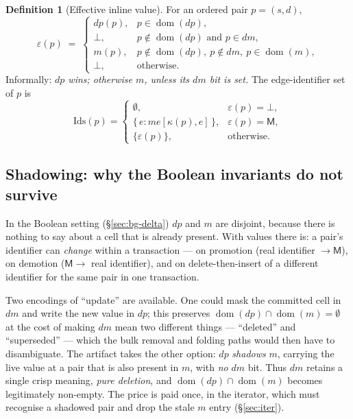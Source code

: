 \documentclass[11pt,a4paper]{article}
\theoremstyle{plain}
\theoremstyle{definition}
\newtheorem{definition}[theorem]{Definition}
\theoremstyle{remark}
\newcommand{\M}{\mathsf{M}}
\newcommand{\dom}{\operatorname{dom}}
\begin{document}
\begin{definition}[Effective inline value]
\label{def:eff}
For an ordered pair $p = (s,d)$,
\[
  \varepsilon(p) \;=\;
  \begin{cases}
    dp(p), & p \in \dom(dp),\\
    \bot,  & p \notin \dom(dp) \text{ and } p \in dm,\\
    m(p),  & p \notin \dom(dp),\ p \notin dm,\ p \in \dom(m),\\
    \bot,  & \text{otherwise.}
  \end{cases}
\]
Informally: \emph{$dp$ wins; otherwise $m$, unless its $dm$ bit is set.} The
edge-identifier set of $p$ is
\[
  \mathrm{Ids}(p) =
  \begin{cases}
    \emptyset, & \varepsilon(p) = \bot,\\
    \{\, e : me[\kappa(p), e] \,\}, & \varepsilon(p) = \M,\\
    \{\varepsilon(p)\}, & \text{otherwise.}
  \end{cases}
\]
\end{definition}

\subsection{Shadowing: why the Boolean invariants do not survive}

In the Boolean setting (\S\ref{sec:bg-delta}) $dp$ and $m$ are disjoint,
because there is nothing to say about a cell that is already present. With
values there is: a pair's identifier can \emph{change} within a transaction
--- on promotion (real identifier $\to \M$), on demotion ($\M \to$ real
identifier), and on delete-then-insert of a different identifier for the same
pair in one transaction.

Two encodings of ``update'' are available. One could mask the committed cell
in $dm$ and write the new value in $dp$; this preserves
$\dom(dp) \cap \dom(m) = \emptyset$ at the cost of making $dm$ mean two
different things --- ``deleted'' and ``superseded'' --- which the bulk removal
and folding paths would then have to disambiguate. The artifact takes the
other option: $dp$ \emph{shadows} $m$, carrying the live value at a pair that
is also present in $m$, with \emph{no} $dm$ bit. Thus $dm$ retains a single
crisp meaning, \emph{pure deletion}, and $\dom(dp) \cap \dom(m)$ becomes
legitimately non-empty. The price is paid once, in the iterator, which must
recognise a shadowed pair and drop the stale $m$ entry (\S\ref{sec:iter}).
\end{document}
